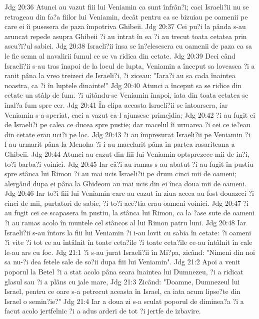 Jdg 20:36  Atunci au vazut fiii lui Veniamin ca sunt înfrân?i; caci Israeli?ii nu se retrageau din fa?a fiilor lui Veniamin, decât pentru ca se bizuiau pe oamenii pe care ei îi pusesera de paza împotriva Ghibeii.
Jdg 20:37  Cei pu?i la pânda s-au aruncat repede asupra Ghibeii ?i au intrat în ea ?i au trecut toata cetatea prin ascu?i?ul sabiei.
Jdg 20:38  Israeli?ii însa se în?elesesera cu oamenii de paza ca sa le fie semn al navalirii fumul ce se va ridica din cetate.
Jdg 20:39  Deci când Israeli?ii s-au tras înapoi de la locul de lupta, Veniamin a început sa loveasca ?i a ranit pâna la vreo treizeci de Israeli?i, ?i ziceau: "Iara?i au sa cada înaintea noastra, ca ?i în luptele dinainte!"
Jdg 20:40  Atunci a început sa se ridice din cetate un stâlp de fum. ?i uitându-se Veniamin înapoi, iata din toata cetatea se înal?a fum spre cer.
Jdg 20:41  În clipa aceasta Israeli?ii se întoarsera, iar Veniamin s-a speriat, caci a vazut ca-l ajunsese primejdia;
Jdg 20:42  ?i au fugit ei de Israeli?i pe calea ce ducea spre pustie; dar macelul îi urmarea ?i cei ce ie?eau din cetate erau uci?i pe loc.
Jdg 20:43  ?i au împresurat Israeli?ii pe Veniamin ?i l-au urmarit pâna la Menoha ?i i-au macelarit pâna în partea rasariteana a Ghibeii.
Jdg 20:44  Atunci au cazut din fiii lui Veniamin optsprezece mii de in?i, to?i barba?i voinici.
Jdg 20:45  Iar câ?i au ramas s-au abatut ?i au fugit în pustiu spre stânca lui Rimon ?i au mai ucis Israeli?ii pe drum cinci mii de oameni; alergând dupa ei pâna la Ghideom au mai ucis din ei înca doua mii de oameni.
Jdg 20:46  Iar to?i fiii lui Veniamin care au cazut în ziua aceea au fost douazeci ?i cinci de mii, purtatori de sabie, ?i to?i ace?tia erau oameni voinici.
Jdg 20:47  ?i au fugit cei ce scapasera în pustiu, la stânca lui Rimon, ca la ?ase sute de oameni ?i au ramas acolo în muntele cel stâncos al lui Rimon patru luni.
Jdg 20:48  Iar Israeli?ii s-au întors la fiii lui Veniamin ?i i-au lovit cu sabia în cetate: ?i oameni ?i vite ?i tot ce au întâlnit în toate ceta?ile ?i toate ceta?ile ce-au întâlnit în cale le-au ars cu foc.
Jdg 21:1  ?i s-au jurat Israeli?ii în Mi?pa, zicând: "Nimeni din noi sa nu-?i dea fetele sale de so?ii dupa fiii lui Veniamin".
Jdg 21:2  Apoi a venit poporul la Betel ?i a stat acolo pâna seara înaintea lui Dumnezeu, ?i a ridicat glasul sau ?i a plâns cu jale mare,
Jdg 21:3  Zicând: "Doamne, Dumnezeul lui Israel, pentru ce oare s-a petrecut aceasta în Israel, ca iata acum lipse?te din Israel o semin?ie?"
Jdg 21:4  Iar a doua zi s-a sculat poporul de diminea?a ?i a facut acolo jertfelnic ?i a adus arderi de tot ?i jertfe de izbavire.
